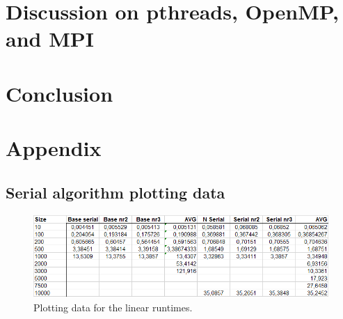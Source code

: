 \documentclass[a4paper,11pt,oneside]{book}
\begin{document}

\chapter{Discussion on pthreads, OpenMP, and MPI}


\chapter{Conclusion}


\newpage
{}
\chapter{Appendix}
\section{Serial algorithm plotting data}

\begin{figure}[H]
  \centering
  \begin{minipage}[b]{0.9\textwidth}
    \includegraphics[width=\textwidth]{plotdata.png}
    \caption{Plotting data for the linear runtimes.}
  \end{minipage}
\end{figure}
\end{document}
